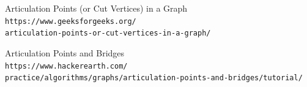 \documentclass[12pt]{article}
\begin{document}
\renewcommand\refname{Referências}
\begin{thebibliography}{9}        
    Articulation Points (or Cut Vertices) in a Graph
    \\\texttt{https://www.geeksforgeeks.org/\\
    articulation-points-or-cut-vertices-in-a-graph/}

    Articulation Points and Bridges
    \\\texttt{https://www.hackerearth.com/\\
    practice/algorithms/graphs/articulation-points-and-bridges/tutorial/}
\end{thebibliography}
\end{document}
